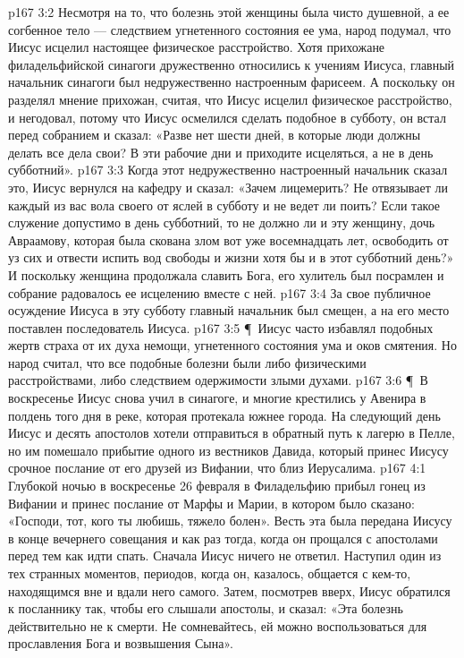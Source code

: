 \vs p167 3:2 Несмотря на то, что болезнь этой женщины была чисто душевной, а ее согбенное тело --- следствием угнетенного состояния ее ума, народ подумал, что Иисус исцелил настоящее физическое расстройство. Хотя прихожане филадельфийской синагоги дружественно относились к учениям Иисуса, главный начальник синагоги был недружественно настроенным фарисеем. А поскольку он разделял мнение прихожан, считая, что Иисус исцелил физическое расстройство, и негодовал, потому что Иисус осмелился сделать подобное в субботу, он встал перед собранием и сказал: «Разве нет шести дней, в которые люди должны делать все дела свои? В эти рабочие дни и приходите исцеляться, а не в день субботний».
\vs p167 3:3 Когда этот недружественно настроенный начальник сказал это, Иисус вернулся на кафедру и сказал: «Зачем лицемерить? Не отвязывает ли каждый из вас вола своего от яслей в субботу и не ведет ли поить? Если такое служение допустимо в день субботний, то не должно ли и эту женщину, дочь Авраамову, которая была скована злом вот уже восемнадцать лет, освободить от уз сих и отвести испить вод свободы и жизни хотя бы и в этот субботний день?» И поскольку женщина продолжала славить Бога, его хулитель был посрамлен и собрание радовалось ее исцелению вместе с ней.
\vs p167 3:4 За свое публичное осуждение Иисуса в эту субботу главный начальник был смещен, а на его место поставлен последователь Иисуса.
\vs p167 3:5 \P\ Иисус часто избавлял подобных жертв страха от их духа немощи, угнетенного состояния ума и оков смятения. Но народ считал, что все подобные болезни были либо физическими расстройствами, либо следствием одержимости злыми духами.
\vs p167 3:6 \P\ В воскресенье Иисус снова учил в синагоге, и многие крестились у Авенира в полдень того дня в реке, которая протекала южнее города. На следующий день Иисус и десять апостолов хотели отправиться в обратный путь к лагерю в Пелле, но им помешало прибытие одного из вестников Давида, который принес Иисусу срочное послание от его друзей из Вифании, что близ Иерусалима.
\vs p167 4:1 Глубокой ночью в воскресенье 26 февраля в Филадельфию прибыл гонец из Вифании и принес послание от Марфы и Марии, в котором было сказано: «Господи, тот, кого ты любишь, тяжело болен». Весть эта была передана Иисусу в конце вечернего совещания и как раз тогда, когда он прощался с апостолами перед тем как идти спать. Сначала Иисус ничего не ответил. Наступил один из тех странных моментов, периодов, когда он, казалось, общается с кем\hyp{}то, находящимся вне и вдали него самого. Затем, посмотрев вверх, Иисус обратился к посланнику так, чтобы его слышали апостолы, и сказал: «Эта болезнь действительно не к смерти. Не сомневайтесь, ей можно воспользоваться для прославления Бога и возвышения Сына».

